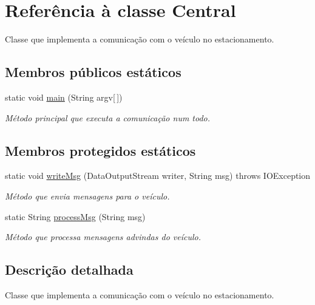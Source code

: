 \hypertarget{class_central}{}\section{Referência à classe Central}
\label{class_central}


Classe que implementa a comunicação com o veículo no estacionamento.  


\subsection*{Membros públicos estáticos}
\begin{DoxyCompactItemize}
\item 
\mbox{\label{class_central_af9e3f40335a1656dd1c911d90c2fff29}} 
static void \mbox{\hyperlink{class_central_af9e3f40335a1656dd1c911d90c2fff29}{main}} (String argv\mbox{[}$\,$\mbox{]})
\begin{DoxyCompactList}\small\item\em Método principal que executa a comunicação num todo. \end{DoxyCompactList}\end{DoxyCompactItemize}
\subsection*{Membros protegidos estáticos}
\begin{DoxyCompactItemize}
\item 
static void \mbox{\hyperlink{class_central_a280abaf8e4b428b5c7a25065c61df800}{write\+Msg}} (Data\+Output\+Stream writer, String msg)  throws I\+O\+Exception 
\begin{DoxyCompactList}\small\item\em Método que envia mensagens para o veículo. \end{DoxyCompactList}\item 
static String \mbox{\hyperlink{class_central_a30d9b358a611ce826fcc31165745c228}{process\+Msg}} (String msg)
\begin{DoxyCompactList}\small\item\em Método que processa mensagens advindas do veículo. \end{DoxyCompactList}\end{DoxyCompactItemize}


\subsection{Descrição detalhada}
Classe que implementa a comunicação com o veículo no estacionamento. 

